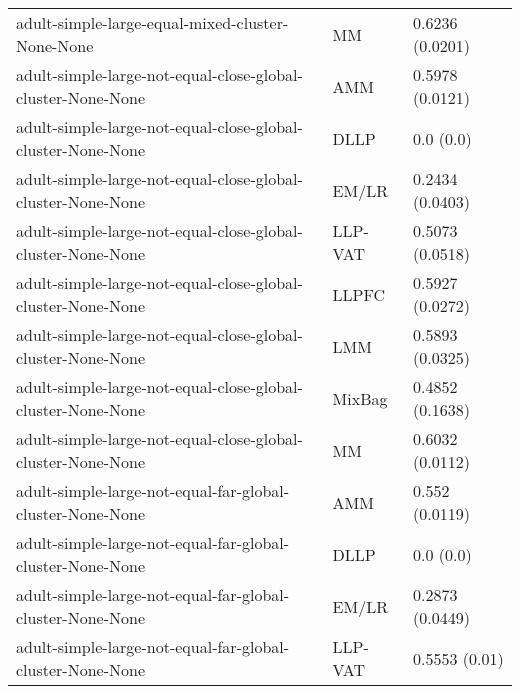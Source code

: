 \begin{longtable}{lll}
                                                             adult-simple-large-equal-mixed-cluster-None-None &        MM &                       0.6236 (0.0201) \\
                                                  adult-simple-large-not-equal-close-global-cluster-None-None &       AMM &                       0.5978 (0.0121) \\
                                                  adult-simple-large-not-equal-close-global-cluster-None-None &      DLLP &                             0.0 (0.0) \\
                                                  adult-simple-large-not-equal-close-global-cluster-None-None &     EM/LR &                       0.2434 (0.0403) \\
                                                  adult-simple-large-not-equal-close-global-cluster-None-None &   LLP-VAT &                       0.5073 (0.0518) \\
                                                  adult-simple-large-not-equal-close-global-cluster-None-None &     LLPFC &                       0.5927 (0.0272) \\
                                                  adult-simple-large-not-equal-close-global-cluster-None-None &       LMM &                       0.5893 (0.0325) \\
                                                  adult-simple-large-not-equal-close-global-cluster-None-None &    MixBag &                       0.4852 (0.1638) \\
                                                  adult-simple-large-not-equal-close-global-cluster-None-None &        MM &                       0.6032 (0.0112) \\
                                                    adult-simple-large-not-equal-far-global-cluster-None-None &       AMM &                        0.552 (0.0119) \\
                                                    adult-simple-large-not-equal-far-global-cluster-None-None &      DLLP &                             0.0 (0.0) \\
                                                    adult-simple-large-not-equal-far-global-cluster-None-None &     EM/LR &                       0.2873 (0.0449) \\
                                                    adult-simple-large-not-equal-far-global-cluster-None-None &   LLP-VAT &                         0.5553 (0.01) \\

\end{longtable}

